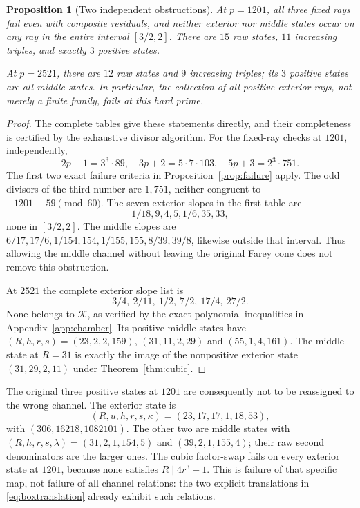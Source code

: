 \documentclass[11pt]{article}
\newtheorem{proposition}[theorem]{Proposition}
\theoremstyle{remark}\newtheorem{remark}[theorem]{Remark}
\begin{document}
\begin{proposition}[Two independent obstructions]\label{prop:stress}
At $p=1201$, all three fixed rays fail even with composite residuals, and neither exterior nor middle states occur on any ray in the entire interval $[3/2,2]$. There are $15$ raw states, $11$ increasing triples, and exactly $3$ positive states.

At $p=2521$, there are $12$ raw states and $9$ increasing triples; its $3$ positive states are all middle states. In particular, \emph{the collection of all positive exterior rays, not merely a finite family, fails at this hard prime}.
\end{proposition}
\begin{proof}
The complete tables give these statements directly, and their completeness is certified by the exhaustive divisor algorithm. For the fixed-ray checks at $1201$, independently,
\[
 2p+1=3^3\cdot89,\quad3p+2=5\cdot7\cdot103,\quad
 5p+3=2^3\cdot751.
\]
The first two exact failure criteria in Proposition~\ref{prop:failure} apply. The odd divisors of the third number are $1,751$, neither congruent to $-1201\equiv59\pmod{60}$. The seven exterior slopes in the first table are
\[
 1/18,9,4,5,1/6,35,33,
\]
none in $[3/2,2]$. The middle slopes are $6/17,17/6,1/154,154,1/155,155,8/39,39/8$, likewise outside that interval. Thus allowing the middle channel without leaving the original Farey cone does not remove this obstruction.

At $2521$ the complete exterior slope list is
\[
 3/4,\ 2/11,\ 1/2,\ 7/2,\ 17/4,\ 27/2.
\]
None belongs to $\mathcal K$, as verified by the exact polynomial inequalities in Appendix~\ref{app:chamber}. Its positive middle states have $(R,h,r,s)=(23,2,2,159)$, $(31,11,2,29)$ and $(55,1,4,161)$. The middle state at $R=31$ is exactly the image of the nonpositive exterior state $(31,29,2,11)$ under Theorem~\ref{thm:cubic}.
\end{proof}

The original three positive states at $1201$ are consequently not to be reassigned to the wrong channel. The exterior state is
\[
 (R,u,h,r,s,\kappa)=(23,17,17,1,18,53),
\]
with $(306,16218,1082101)$. The other two are middle states with $(R,h,r,s,\lambda)=(31,2,1,154,5)$ and $(39,2,1,155,4)$; their raw second denominators are the larger ones. The cubic factor-swap fails on every exterior state at $1201$, because none satisfies $R\mid4r^3-1$. This is failure of that specific map, not failure of all channel relations: the two explicit translations in \eqref{eq:boxtranslation} already exhibit such relations.
\end{document}
